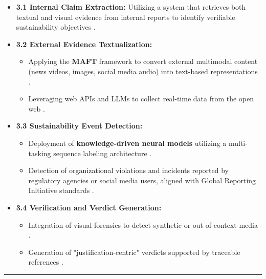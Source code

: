 \documentclass{article}
\begin{document}
\begin{itemize}
\item 

\textbf{3.1 Internal Claim Extraction:} Utilizing a system that retrieves both textual and visual evidence from internal reports to identify verifiable sustainability objectives  \parencite{mohammad_mahdavi_619c09a8}.\item 

\textbf{3.2 External Evidence Textualization:}
\begin{itemize}
\item 

Applying the \textbf{MAFT} framework to convert external multimodal content (news videos, images, social media audio) into text-based representations  \parencite{kazuya_kakizaki_4193ad80}.\item 

Leveraging web APIs and LLMs to collect real-time data from the open web  \parencite{kazuya_kakizaki_4193ad80}.
\end{itemize}\item 

\textbf{3.3 Sustainability Event Detection:}
\begin{itemize}
\item 

Deployment of \textbf{knowledge-driven neural models} utilizing a multi-tasking sequence labeling architecture  \parencite{abir_naskar_17efeb7b}.\item 

Detection of organizational violations and incidents reported by regulatory agencies or social media users, aligned with Global Reporting Initiative standards  \parencite{abir_naskar_17efeb7b}.
\end{itemize}\item 

\textbf{3.4 Verification and Verdict Generation:}
\begin{itemize}
\item 

Integration of visual forensics to detect synthetic or out-of-context media  \parencite{vinh_nguyen_phan_020d3d5e}.\item 

Generation of "justification-centric" verdicts supported by traceable references  \parencite[]{kaoukis__georgios_35bab107, abhijeet_b__moghe_963e6c96}.
\end{itemize}
\end{itemize}
\begin{center}\rule{\linewidth}{0.5pt}\end{center}
\end{document}
